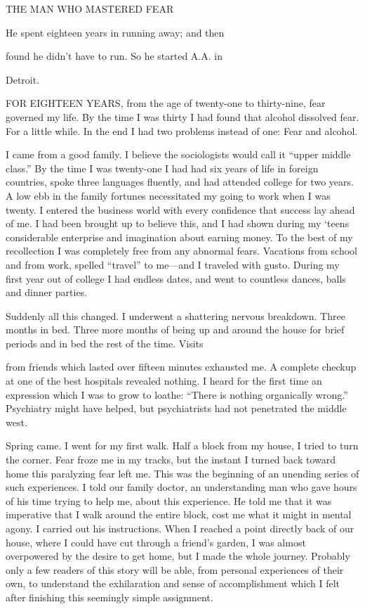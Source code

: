 
THE MAN WHO MASTERED FEAR

He spent eighteen years in running away; and then

found he didn’t have to run. So he started A.A. in

Detroit.

 

      FOR EIGHTEEN YEARS, from the age of twenty-one to thirty-nine, fear governed my life. By the time I was thirty I had found that alcohol dissolved fear. For a little while. In the end I had two problems instead of one: Fear and alcohol.

I came from a good family. I believe the sociologists would call it “upper middle class.” By the time I was twenty-one I had had six years of life in foreign countries, spoke three languages fluently, and had attended college for two years. A low ebb in the family fortunes necessitated my going to work when I was twenty. I entered the business world with every confidence that success lay ahead of me. I had been brought up to believe this, and I had shown during my ‘teens considerable enterprise and imagination about earning money. To the best of my recollection I was completely free from any abnormal fears. Vacations from school and from work, spelled “travel” to me—and I traveled with gusto. During my first year out of college I had endless dates, and went to countless dances, balls and dinner parties.

Suddenly all this changed. I underwent a shattering nervous breakdown. Three months in bed. Three more months of being up and around the house for brief periods and in bed the rest of the time. Visits

from friends which lasted over fifteen minutes exhausted me. A complete checkup at one of the best hospitals revealed nothing. I heard for the first time an expression which I was to grow to loathe: “There is nothing organically wrong.” Psychiatry might have helped, but psychiatrists had not penetrated the middle west.

Spring came. I went for my first walk. Half a block from my house, I tried to turn the corner. Fear froze me in my tracks, but the instant I turned back toward home this paralyzing fear left me. This was the beginning of an unending series of such experiences. I told our family doctor, an understanding man who gave hours of his time trying to help me, about this experience. He told me that it was imperative that I walk around the entire block, cost me what it might in mental agony. I carried out his instructions. When I reached a point directly back of our house, where I could have cut through a friend’s garden, I was almost overpowered by the desire to get home, but I made the whole journey. Probably only a few readers of this story will be able, from personal experiences of their own, to understand the exhilaration and sense of accomplishment which I felt after finishing this seemingly simple assignment.

